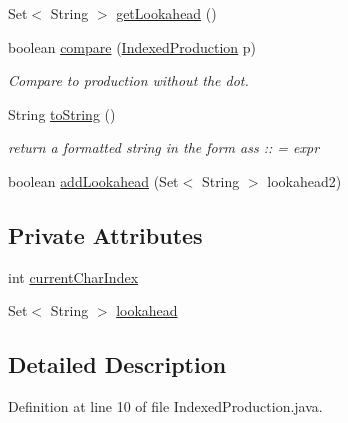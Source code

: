 \begin{DoxyCompactItemize}
\item 
Set$<$ String $>$ \hyperlink{classcontext_free_1_1parser_1_1_indexed_production_a94e0e318a96518ee50607e682e7f0382}{get\-Lookahead} ()
\item 
boolean \hyperlink{classcontext_free_1_1parser_1_1_indexed_production_aa79a2e2cbbc1f35d6416647d80daf3d8}{compare} (\hyperlink{classcontext_free_1_1parser_1_1_indexed_production}{Indexed\-Production} p)
\begin{DoxyCompactList}\small\item\em Compare to production without the dot. \end{DoxyCompactList}\item 
String \hyperlink{classcontext_free_1_1parser_1_1_indexed_production_a061cd84bd37e6111edcd52bcb5b9c749}{to\-String} ()
\begin{DoxyCompactList}\small\item\em return a formatted string in the form ass \-:\-: = expr \end{DoxyCompactList}\item 
boolean \hyperlink{classcontext_free_1_1parser_1_1_indexed_production_ae6af99251737ae274afc4028fa6eb13e}{add\-Lookahead} (Set$<$ String $>$ lookahead2)
\end{DoxyCompactItemize}
\subsection*{Private Attributes}
\begin{DoxyCompactItemize}
\item 
int \hyperlink{classcontext_free_1_1parser_1_1_indexed_production_a8ed426b66a378ce272cc13ae397e52cd}{current\-Char\-Index}
\item 
Set$<$ String $>$ \hyperlink{classcontext_free_1_1parser_1_1_indexed_production_a58e8935cd1c81a767b47b4d31c87b35c}{lookahead}
\end{DoxyCompactItemize}


\subsection{Detailed Description}


Definition at line 10 of file Indexed\-Production.\-java.



